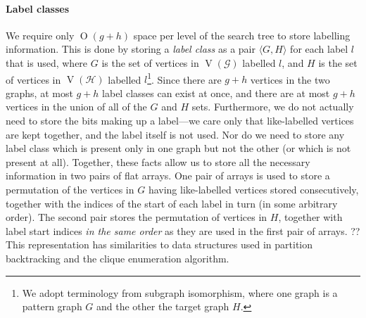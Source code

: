 \documentclass[letterpaper]{article}
\newcommand{\citet}[1]{\citeauthor{#1} \shortcite{#1}}
\newcommand{\graphG}{\mathcal{G}}
\newcommand{\graphH}{\mathcal{H}}
\newcommand{\setG}{G}
\newcommand{\setH}{H}
\DeclareMathOperator{\V}{V}
\newcommand{\BigO}[1]{\ensuremath{\operatorname{O}\left(#1\right)}}
\begin{document}
\paragraph{Label classes} We require only $\BigO{g+h}$ space per level of the
search tree to store labelling information.  This is done by storing a
\emph{label class} as a pair $\langle \setG,\setH \rangle$ for each label $l$ that is
used, where $\setG$ is the set of vertices in $\V(\graphG)$ labelled $l$, and $\setH$ is the
set of vertices in $\V(\graphH)$ labelled $l$\footnote{We adopt terminology from
subgraph isomorphism, where one graph is a pattern graph $\setG$ and the other the
target graph $\setH$.}. Since there are $g + h$ vertices in the two graphs, at most
$g + h$ label classes can exist at once, and there are at most $g + h$ vertices
in the union of all of the $\setG$ and $\setH$ sets. Furthermore, we do not actually
need to store the bits making up a label---we care only that like-labelled
vertices are kept together, and the label itself is not used. Nor do we need to
store any label class which is present only in one graph but not the other (or
which is not present at all).  Together, these facts allow us to store all the
necessary information in two pairs of flat arrays. One pair of arrays is used
to store a permutation of the vertices in $\setG$ having like-labelled vertices
stored consecutively, together with the indices of the start of each label in
turn (in some arbitrary order). The second pair stores the permutation of
vertices in $\setH$, together with label start indices \emph{in the same order} as
they are used in the first pair of arrays. ?? This representation has
similarities to data structures used in partition backtracking and the \citet{DBLP:journals/cacm/BronK73} clique enumeration algorithm.
\end{document}

